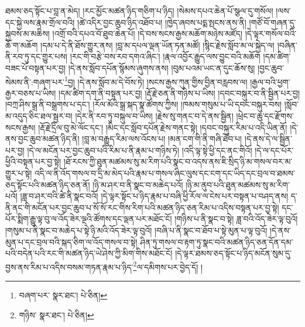 ཐམས་ཅད་སྟོང་པ་བླ་ན་མེད། །རང་མྱོང་མཚན་ཉིད་གཅིག་པ་ཉིད། །སེམས་དཔའ་ཆེན་པོ་སྩལ་དུ་གསོལ། །ལས་དང་སྐྱེ་ལས་རྣམ་གྲོལ་བའི། །ཚེ་འདིར་བྱང་ཆུབ་ཉིད་འཐོབ་པ། །ཁྱེད་ཞབས་པདྨ་སྤངས་ནས་ནི། །གཙོ་བོ་གཞན་དུ་སྐྱབས་མ་མཆིས། །འགྲོ་བའི་དཔའ་བོ་ཐུབ་ཆེན་པོ། །དེ་བས་སངས་རྒྱས་མཆོག་མཉེས་མཛོད། །དེ་ལྟར་གསོལ་བའི་ཆོ་ག་མཆོག །དམ་པ་དེ་ནི་ཐོས་གྱུར་ནས། །བླ་མ་དཔལ་ལྡན་ཡོན་ཏན་མཚོ། །སྙིང་རྗེས་སློབ་མ་ལ་སྐྱེད་ལ། །བཞིན་ནི་རབ་ཏུ་དང་གྱུར་པས། །རང་གི་བརྩེ་བས་རབ་དགའ་ཞིང་། །རྣལ་འབྱོར་རྒྱུད་ལས་བྱུང་བའི་མཆོག །དམ་ཚིག་བཟང་པོ་བསྟན་པར་བྱ། །དེ་ནས་སློབ་དཔོན་སྙོམས་ཞུགས་ནས། །བུམ་པའམ་ཡང་ན་དུང་ཆོས་སུ། །བྱང་ཆུབ་སེམས་ནི་:གཞག་པར་\footnote{བཞག་པར་  སྣར་ཐང་།  པེ་ཅིན། }བྱ། །དེ་ནས་སློབ་མ་དེ་བོས་ཏེ། །སངས་རྒྱས་ཀུན་གྱིས་བྱིན་བརླབས་ལ། །རྒྱལ་བའི་ཕྱག་རྒྱར་བཅས་པ་ཡིས། །དམ་ཚིག་དག་ནི་བསྟན་པར་བྱ། །རྡོ་རྗེ་ཅན་ནི་གཉིས་པ་ཡིས། །དབང་བསྐུར་བ་ནི་སྦྱིན་པར་བྱ། །བཀྲ་ཤིས་སྒྲ་ནི་བསྒྲགས་པ་དང་། །རོལ་མོའི་སྒྲ་སྐད་སྣ་ཚོགས་ཀྱིས། །ཁམས་གསུམ་པ་ཡི་དབང་བསྐུར་བས། །སློབ་མ་འདུད་ཅིང་ཐལ་སྦྱར་བ། །དེར་ནི་རབ་ཏུ་བསྐུལ་བ་ཡིས། །རྗེས་སུ་གནང་བ་དེ་ནས་སྦྱིན། །ཕྲེང་བ་ཆུ་དང་རྫོགས་སངས་རྒྱས། །རྡོ་རྗེ་དྲིལ་བུ་མེ་ལོང་དང་། །མིང་དང་སློབ་དཔོན་རྗེས་གནང་སྟེ། །དབང་བསྐུར་རིམ་པ་འདི་ཡིན་ནོ། །དེ་ནས་བྱང་ཆུབ་མཚན་ཉིད་ནི། །བླ་མ་བརྒྱུད་རིམ་ལས་འོངས་པ། །མན་ངག་གི་ནི་གཞི་ཐོབ་པ། །དེ་ནས་དེ་ལ་སྦྱིན་པར་བྱ། །དེ་ལ་མངོན་པར་བྱང་ཆུབ་པའི་རིམ་པ་ནི་རྣམ་པ་གཉིས་ཏེ། །འདི་ལྟ་སྟེ་ཕྱི་དང་ནང་གིའོ། །དེ་ལ་དང་པོར་ཕྱིའི་བསྟན་པར་བྱ་སྟེ། །ཐོ་རངས་ཀྱི་ཐུན་མཚམས་སུ་མ་རིག་པའི་སྣང་བ་འདས་ནས་ཇི་སྲིད་ཉི་མ་གསལ་བར་མ་གྱུར་པ་སྟེ། འདི་ལ་ནི་འོད་གསལ་བ་དྲི་མ་མེད་པའི་རྣམ་པ་གསལ་ཞིང་ལུས་དང་ངག་དང་ཡིད་དང་བྲལ་བ་ཐམས་ཅད་སྟོང་པའི་མཚན་ཉིད་ཅན་ནོ། །ཉི་མ་ཤར་བ་ནི་སྣང་བ་མཆེད་པའོ། །ཉི་མ་ནུབ་པའི་ཐུན་མཚམས་སུ་མ་རིག་པའོ། །ཟླ་བ་ཤར་བའི་ཚེ་ནི་སྣང་བའོ། །དེ་ལྟར་སྟོང་པ་ཉིད་རྣམ་པ་བཞི་ཕྱི་རོལ་ལ་ངེས་པར་བསྟན་པ་བཤད་ནས། ད་ནི་ནང་གི་མངོན་པར་བྱང་ཆུབ་པ་སོ་སོ་རང་གིས་རིག་པའི་མཚན་ཉིད་ཅན་རིམ་པ་འདིས་བསྟན་པར་བྱ་སྟེ། དང་པོར་སྨིག་རྒྱུ་ལྟ་བུ་ལ་འོད་ཟེར་ལྔའི་ཚོགས་དང་ལྡན་པར་མཐོང་ངོ། །གཉིས་པ་ནི་སྣང་བ་སྟེ། ཟླ་བའི་འོད་ཟེར་ལྟ་བུའོ། །གསུམ་པ་ནི་སྣང་བ་མཆེད་པ་སྟེ་ཉི་མའི་འོད་ཟེར་ལྟ་བུའོ། །བཞི་པ་ནི་སྣང་བ་ཐོབ་པ་སྟེ་མུན་པ་ལྟ་བུའོ། །དེ་ནས་མུན་པ་དང་བྲལ་བའི་སྐད་ཅིག་ལ་འོད་གསལ་བ་སྟེ། ཤིན་ཏུ་གསལ་བ་རྟག་ཏུ་སྣང་བའི་མཚན་ཉིད་ཅན་དོན་དམ་པའི་བདེན་པའི་རང་གི་མཚན་ཉིད་ཡེ་ཤེས་ཀྱི་མིག་གིས་མཐོང་ངོ། །དེ་ལྟར་ཐམས་ཅད་སྟོང་པ་ཉིད་མངོན་སུམ་དུ་བྱས་ནས་རིམ་པ་འདིས་བསམ་གཏན་རྣམ་པ་ཉིད་\footnote{གཉིས་  སྣར་ཐང་།  པེ་ཅིན། }ལ་དམིགས་པར་བྱེད་དོ། །
